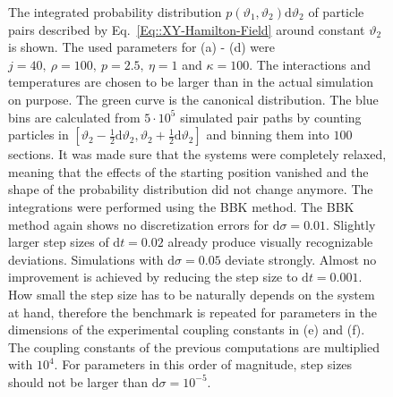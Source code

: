 \begin{figure}[htp]
		\caption{The integrated probability distribution $p(\vartheta_1, \vartheta_2)\text{d}\vartheta_2$ of particle pairs described by Eq.~\eqref{Eq::XY-Hamilton-Field} around constant $\vartheta_2$ is shown. The used parameters for (a) - (d) were $j =	40,~ \rho =	100,~ p=2.5,~ \eta =	1$ and $\kappa = 100$. The interactions and temperatures are chosen to be larger than in the actual simulation on purpose. The green curve is the canonical distribution. The blue bins are calculated from $5 \cdot 10^5$ simulated pair paths by counting particles in $\left[\vartheta_2 - \tfrac{1}{2} \text{d} \vartheta_2, \vartheta_2 + \tfrac{1}{2} \text{d} \vartheta_2 \right]$ and binning them into $100$ sections. It was made sure that the systems were completely relaxed, meaning that the effects of the starting position vanished and the shape of the probability distribution did not change anymore. The integrations were performed using the BBK method. The BBK method again shows no discretization errors for $\text{d}\sigma=0.01$. Slightly larger step sizes of $\text{d}t =	0.02$ already produce visually recognizable deviations. Simulations with $\text{d}\sigma = 0.05 $ deviate strongly. Almost no improvement is achieved by reducing the step size to $\text{d}t =	0.001$. How small the step size has to be naturally depends on the system at hand, therefore the benchmark is repeated for parameters in the dimensions of the experimental coupling constants in (e) and (f). The coupling constants of the previous computations are multiplied with $10^4$. For parameters in this order of magnitude, step sizes should not be larger than $\text{d}\sigma = 10^{-5}$.}
		\label{Fig::Pair-Prob-Dist}
	\end{figure}
	
